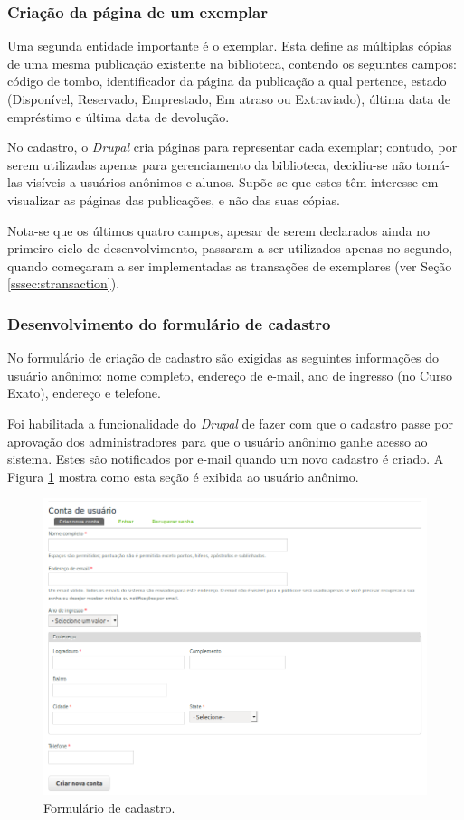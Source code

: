 \documentclass[a4paper]{article}
\begin{document}
\subsubsection{Criação da página de um exemplar}

Uma segunda entidade importante é o exemplar. Esta define as múltiplas cópias de uma mesma publicação existente na biblioteca, contendo os seguintes campos: código de tombo, identificador da página da publicação a qual pertence, estado (Disponível, Reservado, Emprestado, Em atraso ou Extraviado), última data de empréstimo e última data de devolução.

No cadastro, o \textit{Drupal} cria páginas para representar cada exemplar; contudo, por serem utilizadas apenas para gerenciamento da biblioteca, decidiu-se não torná-las visíveis a usuários anônimos e alunos. Supõe-se que estes têm interesse em visualizar as páginas das publicações, e não das suas cópias.

Nota-se que os últimos quatro campos, apesar de serem declarados ainda no primeiro ciclo de desenvolvimento, passaram a ser utilizados apenas no segundo, quando começaram a ser implementadas as transações de exemplares (ver Seção \ref{sssec:stransaction}).

\subsubsection{Desenvolvimento do formulário de cadastro}

No formulário de criação de cadastro são exigidas as seguintes informações do usuário anônimo: nome completo, endereço de e-mail, ano de ingresso (no Curso Exato), endereço e telefone.

Foi habilitada a funcionalidade do \textit{Drupal} de fazer com que o cadastro passe por aprovação dos administradores para que o usuário anônimo ganhe acesso ao sistema. Estes são notificados por e-mail quando um novo cadastro é criado. A Figura \ref{cadastro} mostra como esta seção é exibida ao usuário anônimo.

\begin{figure}[pbth!]
\centering
\includegraphics[width=140mm]{img/newuser.png}
\caption{Formulário de cadastro.\label{cadastro}}
\end{figure}
\end{document}
